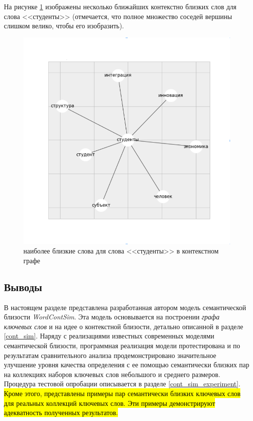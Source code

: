 На рисунке \ref{img:sim_2} изображены несколько ближайших контекстно близких слов для слова <<студенты>> (отмечается, что полное множество соседей вершины слишком велико, чтобы его изобразить).

\begin{figure}[ht]
  \begin{minipage}[ht]{1.0\linewidth}\centering
    \includegraphics[width=1.0\linewidth]{Dissertation/pics/students_sim}
    \caption{наиболее близкие слова для слова <<студенты>> в контекстном графе}
    \label{img:sim_2}
  \end{minipage}
\end{figure}

\subsection{Выводы}
В настоящем разделе представлена разработанная автором модель семантической близости \emph{WordContSim}. Эта модель основывается на построении \emph{графа ключевых слов} и на идее о контекстной близости, детально описанной в разделе \ref{cont_sim}. Наряду с реализациями известных современных моделями семантической близости, программная реализация модели протестирована и по результатам сравнительного анализа продемонстрировано значительное улучшение уровня качества определения с ее помощью семантически близких пар на коллекциях наборов ключевых слов небольшого и среднего размеров. Процедура тестовой опробации описывается в разделе \ref{cont_sim_experiment}. \hl{Кроме этого, представлены примеры пар семантически близких ключевых слов для реальных коллекций ключевых слов. Эти примеры демонстрируют адекватность полученных результатов.}

